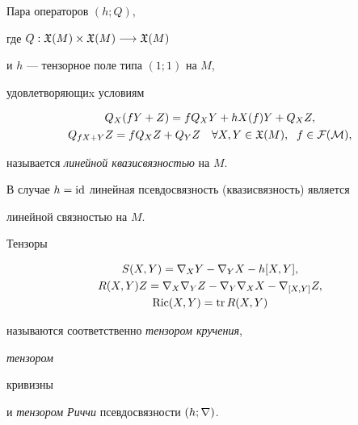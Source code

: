 \begin{defn}


Пара операторов $(h; Q)$,


где $Q: \frak X (M) \times \frak X (M) \longrightarrow \frak X (M)$


и $h$ --- тензорное поле типа $(1;1)$ на $M$,


удовлетворяющиx условиям


\begin{gather*}


Q_{X} (fY+Z)=f Q_{X} Y+hX (f) Y +Q_{X} Z, \\


%


Q_{fX+Y} Z=f Q_{X} Z +Q_{Y} Z \quad \fl X, Y \in \frak X


(M),\ \;f\in \cal F (M),


\end{gather*}


называется {\it линейной квазисвязностью } на $M$.


\end{defn}





В случае $h=\operatorname{id}$ линейная псевдосвязность (квазисвязность) является


линейной связностью на $M$.





\begin{defn}


Тензоры


\begin{gather}


S (X, Y)=\nabla_{X} Y - \nabla_{Y} X - h [X, Y],\\


R (X, Y) Z=\nabla_{X} \nabla_{Y} Z - \nabla_{Y} \nabla


_{X} X - \nabla_{[X, Y]} Z,\\


\Ric (X,Y)=\tr R(X,Y)\notag


\end{gather}


называются соответственно {\it тензором кручения}, {\it тензором


кривизны} и {\it тензором Риччи} псевдосвязности $(h;\nabla)$.


\end{defn}





